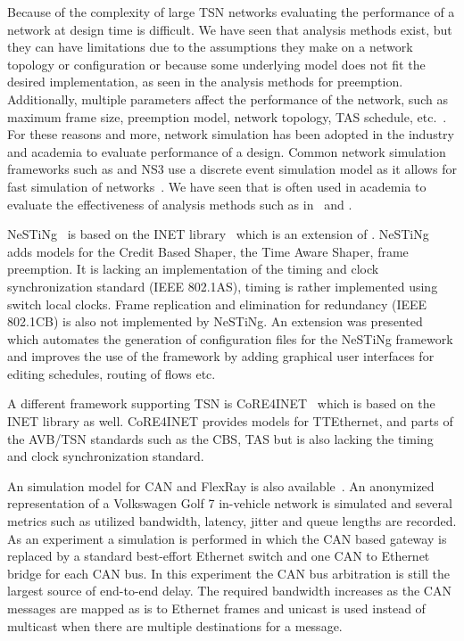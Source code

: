 Because of the complexity of large TSN networks evaluating the performance of a network at design time is difficult. We have seen that analysis methods exist, but they can have limitations due to the assumptions they make on a network topology or configuration or because some underlying model does not fit the desired implementation, as seen in the analysis methods for preemption. Additionally, multiple parameters affect the performance of the network, such as maximum frame size, preemption model, network topology, TAS schedule, etc.~\cite{ashjaei2021time}. For these reasons and more, network simulation has been adopted in the industry and academia to evaluate performance of a design. Common network simulation frameworks such as \omnet and NS3 use a discrete event simulation model as it allows for fast simulation of networks~\cite{ashjaei2021time}. We have seen that \omnet is often used in academia to evaluate the effectiveness of analysis methods such as in~\cite{bello2020schedulability} and \cite{ashjaei2021novel}.

NeSTiNg~\cite{falk2019nesting} is based on the INET library~\cite{meszaros2019inet} which is an extension of \omnet. NeSTiNg adds models for the Credit Based Shaper, the Time Aware Shaper, frame preemption. It is lacking an implementation of the timing and clock synchronization standard (IEEE 802.1AS), timing is rather implemented using switch local clocks. Frame replication and elimination for redundancy (IEEE 802.1CB) is also not implemented by NeSTiNg. An extension was presented~\cite{houtan2021automated} which automates the generation of configuration files for the NeSTiNg framework and improves the use of the framework by adding graphical user interfaces for editing schedules, routing of flows etc.

A different \omnet framework supporting TSN is CoRE4INET~\cite{steinbach2011extension} which is based on the INET library as well. CoRE4INET provides models for TTEthernet, and parts of the AVB/TSN standards such as the CBS, TAS but is also lacking the timing and clock synchronization standard.

An \omnet simulation model for CAN and FlexRay is also available~\cite{meyer2019simulation}. An anonymized representation of a Volkswagen Golf 7 in-vehicle network is simulated and several metrics such as utilized bandwidth, latency, jitter and queue lengths are recorded. As an experiment a simulation is performed in which the CAN based gateway is replaced by a standard best-effort Ethernet switch and one CAN to Ethernet bridge for each CAN bus. In this experiment the CAN bus arbitration is still the largest source of end-to-end delay. The required bandwidth increases as the CAN messages are mapped as is to Ethernet frames and unicast is used instead of multicast when there are multiple destinations for a message.


